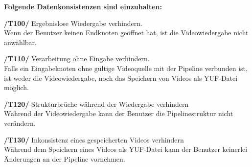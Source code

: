\newpage

\textbf{Folgende Datenkonsistenzen sind einzuhalten:}
\begin{description}
	\item\textbf{/T100/} Ergebnislose Wiedergabe verhindern. ~\\
		Wenn der Benutzer keinen Endknoten geöffnet hat, ist die Videowiedergabe nicht anwählbar.
	\item\textbf{/T110/} Verarbeitung ohne Eingabe verhindern. ~\\
		Falls ein Eingabeknoten ohne gültige Videoquelle mit der Pipeline verbunden ist, ist weder die Videowiedergabe, noch das Speichern von Videos als YUF-Datei möglich.
	\item\textbf{/T120/} Strukturbrüche während der Wiedergabe verhindern ~\\
		Während der Videowiedergabe kann der Benutzer die Pipelinestruktur nicht verändern.
	\item\textbf{/T130/} Inkonsistenz eines gespeicherten Videos verhindern ~\\
		Während dem Speichern eines Videos als YUF-Datei kann der Benutzer keinerlei Änderungen an der Pipeline vornehmen.
\end{description}

